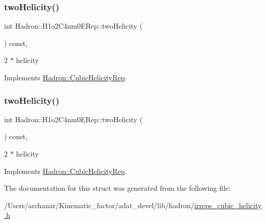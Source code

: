 \subsubsection{\texorpdfstring{twoHelicity()}{twoHelicity()}\hspace{0.1cm}{\footnotesize\ttfamily [1/2]}}
{\footnotesize\ttfamily int Hadron\+::\+H1o2\+C4nm0\+E\+Rep\+::two\+Helicity (\begin{DoxyParamCaption}{ }\end{DoxyParamCaption}) const\hspace{0.3cm}{\ttfamily [inline]}, {\ttfamily [virtual]}}

2 $\ast$ helicity 

Implements \mbox{\hyperlink{structHadron_1_1CubicHelicityRep_af507aa56fc2747eacc8cb6c96db31ecc}{Hadron\+::\+Cubic\+Helicity\+Rep}}.

\mbox{\label{structHadron_1_1H1o2C4nm0ERep_a083d0736946f0404ac8639fd8a954a9d}} 
\subsubsection{\texorpdfstring{twoHelicity()}{twoHelicity()}\hspace{0.1cm}{\footnotesize\ttfamily [2/2]}}
{\footnotesize\ttfamily int Hadron\+::\+H1o2\+C4nm0\+E\+Rep\+::two\+Helicity (\begin{DoxyParamCaption}{ }\end{DoxyParamCaption}) const\hspace{0.3cm}{\ttfamily [inline]}, {\ttfamily [virtual]}}

2 $\ast$ helicity 

Implements \mbox{\hyperlink{structHadron_1_1CubicHelicityRep_af507aa56fc2747eacc8cb6c96db31ecc}{Hadron\+::\+Cubic\+Helicity\+Rep}}.



The documentation for this struct was generated from the following file\+:\begin{DoxyCompactItemize}
\item 
/\+Users/archanar/\+Kinematic\+\_\+factor/adat\+\_\+devel/lib/hadron/\mbox{\hyperlink{lib_2hadron_2irreps__cubic__helicity_8h}{irreps\+\_\+cubic\+\_\+helicity.\+h}}\end{DoxyCompactItemize}
